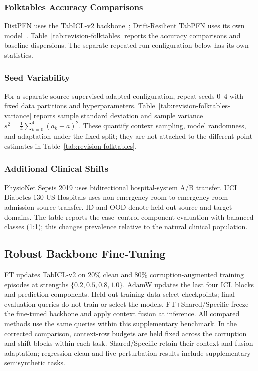\subsubsection{Folktables Accuracy Comparisons}
\label{app:revision-folktables-comparison}
DistPFN uses the TabICL-v2 backbone~\citep{lee2026distpfn}; Drift-Resilient
TabPFN uses its own model~\citep{helli2024drifttabpfn}. Table~\ref{tab:revision-folktables}
reports the accuracy comparisons and baseline dispersions. The separate
repeated-run configuration below has its own statistics.




\subsubsection{Seed Variability}
\label{app:revision-folktables-variance}
For a separate source-supervised adapted configuration, repeat seeds 0--4 with
fixed data partitions and hyperparameters. Table~\ref{tab:revision-folktables-variance}
reports sample standard deviation and sample variance
$s^2=\frac14\sum_{k=0}^4(a_k-\bar a)^2$. These quantify context sampling,
model randomness, and adaptation under the fixed split; they are not attached
to the different point estimates in Table~\ref{tab:revision-folktables}.




\subsubsection{Additional Clinical Shifts}
\label{app:revision-medical}
PhysioNet Sepsis 2019 uses bidirectional hospital-system A/B transfer. UCI
Diabetes 130-US Hospitals uses non-emergency-room to emergency-room admission
source transfer. ID and OOD denote held-out source and target domains.
The table reports the case--control component evaluation with balanced classes
(1:1); this changes prevalence relative to the natural clinical population.




\subsection{Robust Backbone Fine-Tuning}
\label{app:revision-finetuning}
FT updates TabICL-v2 on 20\% clean and 80\% corruption-augmented training
episodes at strengths $\{0.2,0.5,0.8,1.0\}$. AdamW updates the last four ICL
blocks and prediction components. Held-out training data select checkpoints;
final evaluation queries do not train or select the models. FT+Shared/Specific
freeze the fine-tuned backbone and apply context fusion at inference.
All compared methods use the same queries within this supplementary benchmark.
In the corrected comparison, context-row budgets are held fixed across the
corruption and shift blocks within each task. Shared/Specific retain their
context-and-fusion adaptation; regression clean and five-perturbation results
include supplementary semisynthetic tasks.

